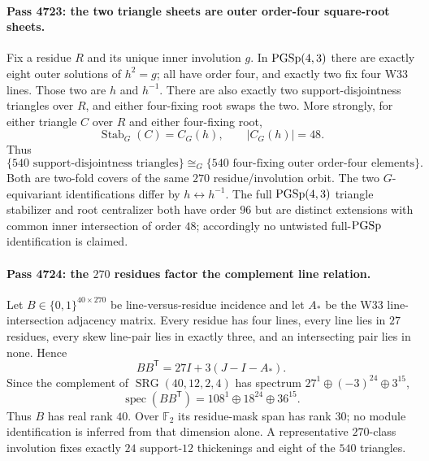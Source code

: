 \paragraph{Pass 4723: the two triangle sheets are outer order-four square-root sheets.}
Fix a residue $R$ and its unique inner involution $g$.  In
$\mathrm{PGSp}(4,3)$ there are exactly eight outer solutions of $h^2=g$; all have order
four, and exactly two fix four W33 lines.  Those two are $h$ and $h^{-1}$.
There are also exactly two support-disjointness triangles over $R$, and either
four-fixing root swaps the two.  More strongly, for either triangle $C$ over
$R$ and either four-fixing root,
\[
 \boxed{\operatorname{Stab}_{G}(C)=C_G(h),\qquad |C_G(h)|=48.}
\]
Thus
\[
 \boxed{
 \{540\text{ support-disjointness triangles}\}
 \cong_G
 \{540\text{ four-fixing outer order-four elements}\}.
 }
\]
Both are two-fold covers of the same $270$ residue/involution orbit.  The two
$G$-equivariant identifications differ by $h\leftrightarrow h^{-1}$.
The full $\mathrm{PGSp}(4,3)$ triangle stabilizer and root centralizer both have order
$96$ but are distinct extensions with common inner intersection of order $48$;
accordingly no untwisted full-$\mathrm{PGSp}$ identification is claimed.

\paragraph{Pass 4724: the $270$ residues factor the complement line relation.}
Let $B\in\{0,1\}^{40\times270}$ be line-versus-residue incidence and let $A_*$
be the W33 line-intersection adjacency matrix.  Every residue has four lines,
every line lies in $27$ residues, every skew line-pair lies in exactly three,
and an intersecting pair lies in none.  Hence
\[
 \boxed{BB^{\mathsf T}=27I+3(J-I-A_*).}
\]
Since the complement of $\operatorname{SRG}(40,12,2,4)$ has spectrum
$27^1\oplus(-3)^{24}\oplus3^{15}$,
\[
 \boxed{\operatorname{spec}(BB^{\mathsf T})
 =108^1\oplus18^{24}\oplus36^{15}.}
\]
Thus $B$ has real rank $40$.  Over $\mathbb F_2$ its residue-mask span has rank
$30$; no module identification is inferred from that dimension alone.  A
representative $270$-class involution fixes exactly $24$ support-$12$
thickenings and eight of the $540$ triangles.

\begin{center}
\end{center}
